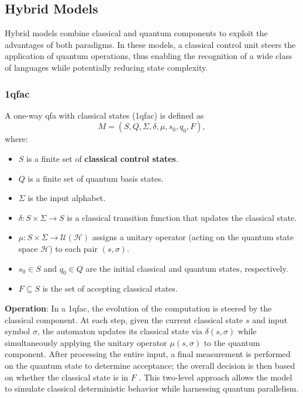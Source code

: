 \subsection{Hybrid Models}
\label{subsec:hybrid-models}

Hybrid models combine classical and quantum components to exploit the advantages of both paradigms. In these models, a classical control unit steers the application of quantum operations, thus enabling the recognition of a wide class of languages while potentially reducing state complexity.

\subsubsection{\acrfull{1qfac}}
\label{sssec:1qfac}
\begin{definition}
A one-way qfa with classical states (\gls{1qfac}) is defined as 
\[
M = (S, Q, \Sigma, \delta, \mu, s_0, q_0, F),
\]
where:
\begin{itemize}
    \item \( S \) is a finite set of \textbf{classical control states}.
    \item \( Q \) is a finite set of quantum basis states.
    \item \( \Sigma \) is the input alphabet.
    \item \(\delta: S \times \Sigma \to S\) is a classical transition function that updates the classical state.
    \item \(\mu: S \times \Sigma \to \mathcal{U}(\mathcal{H})\) assigns a unitary operator (acting on the quantum state space \(\mathcal{H}\)) to each pair \((s,\sigma)\).
    \item \( s_0 \in S \) and \( q_0 \in Q \) are the initial classical and quantum states, respectively.
    \item \( F \subseteq S \) is the set of accepting classical states.
\end{itemize}
\end{definition}

\textbf{Operation}:  
In a \gls{1qfac}, the evolution of the computation is steered by the classical component. At each step, given the current classical state \( s \) and input symbol \( \sigma \), the automaton updates its classical state via \(\delta(s,\sigma)\) while simultaneously applying the unitary operator \(\mu(s,\sigma)\) to the quantum component. After processing the entire input, a final measurement is performed on the quantum state to determine acceptance; the overall decision is then based on whether the classical state is in \( F \) \cite{zheng2012one}. This two-level approach allows the model to simulate classical deterministic behavior while harnessing quantum parallelism.

